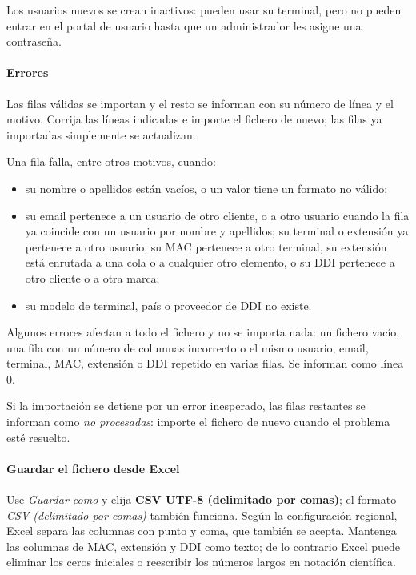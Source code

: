 \documentclass[letterpaper,10pt,spanish]{sphinxmanual}
\begin{document}
Los usuarios nuevos se crean inactivos: pueden usar su terminal, pero no pueden entrar en el portal de usuario hasta que un administrador les asigne una contraseña.


\paragraph{Errores}
\label{administration_portal/brand/clients/virtual_pbx:errors}
Las filas válidas se importan y el resto se informan con su número de línea y el motivo. Corrija las líneas indicadas e importe el fichero de nuevo; las filas ya importadas simplemente se actualizan.

Una fila falla, entre otros motivos, cuando:
\begin{itemize}
\item {} 
su nombre o apellidos están vacíos, o un valor tiene un formato no válido;

\item {} 
su email pertenece a un usuario de otro cliente, o a otro usuario cuando la fila ya coincide con un usuario por nombre y apellidos; su terminal o extensión ya pertenece a otro usuario, su MAC pertenece a otro terminal, su extensión está enrutada a una cola o a cualquier otro elemento, o su DDI pertenece a otro cliente o a otra marca;

\item {} 
su modelo de terminal, país o proveedor de DDI no existe.

\end{itemize}

Algunos errores afectan a todo el fichero y no se importa nada: un fichero vacío, una fila con un número de columnas incorrecto o el mismo usuario, email, terminal, MAC, extensión o DDI repetido en varias filas. Se informan como línea 0.

Si la importación se detiene por un error inesperado, las filas restantes se informan como \emph{no procesadas}: importe el fichero de nuevo cuando el problema esté resuelto.


\paragraph{Guardar el fichero desde Excel}
\label{administration_portal/brand/clients/virtual_pbx:saving-the-file-from-excel}
Use \emph{Guardar como} y elija \textbf{CSV UTF-8 (delimitado por comas)}; el formato \emph{CSV (delimitado por comas)} también funciona. Según la configuración regional, Excel separa las columnas con punto y coma, que también se acepta. Mantenga las columnas de MAC, extensión y DDI como texto; de lo contrario Excel puede eliminar los ceros iniciales o reescribir los números largos en notación científica.
\end{document}
